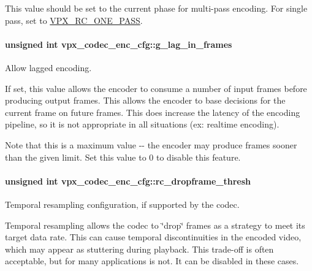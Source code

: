 \-This value should be set to the current phase for multi-\/pass encoding. \-For single pass, set to \hyperlink{group__encoder_gga476c5417f9c15a1dc5d3f68fa44c493fa7b6943a41868e8e26a77e9500f139ca1}{\-V\-P\-X\-\_\-\-R\-C\-\_\-\-O\-N\-E\-\_\-\-P\-A\-S\-S}. \hypertarget{structvpx__codec__enc__cfg_a992668d9e30305f3f7ab2672ea31a890}{
\paragraph[{g\-\_\-lag\-\_\-in\-\_\-frames}]{\setlength{\rightskip}{0pt plus 5cm}unsigned int {\bf vpx\-\_\-codec\-\_\-enc\-\_\-cfg\-::g\-\_\-lag\-\_\-in\-\_\-frames}}}\label{structvpx__codec__enc__cfg_a992668d9e30305f3f7ab2672ea31a890}


\-Allow lagged encoding. 

\-If set, this value allows the encoder to consume a number of input frames before producing output frames. \-This allows the encoder to base decisions for the current frame on future frames. \-This does increase the latency of the encoding pipeline, so it is not appropriate in all situations (ex\-: realtime encoding).

\-Note that this is a maximum value -\/-\/ the encoder may produce frames sooner than the given limit. \-Set this value to 0 to disable this feature. \hypertarget{structvpx__codec__enc__cfg_a619269f9a6904de58c4790e6806a3905}{
\paragraph[{rc\-\_\-dropframe\-\_\-thresh}]{\setlength{\rightskip}{0pt plus 5cm}unsigned int {\bf vpx\-\_\-codec\-\_\-enc\-\_\-cfg\-::rc\-\_\-dropframe\-\_\-thresh}}}\label{structvpx__codec__enc__cfg_a619269f9a6904de58c4790e6806a3905}


\-Temporal resampling configuration, if supported by the codec. 

\-Temporal resampling allows the codec to \char`\"{}drop\char`\"{} frames as a strategy to meet its target data rate. \-This can cause temporal discontinuities in the encoded video, which may appear as stuttering during playback. \-This trade-\/off is often acceptable, but for many applications is not. \-It can be disabled in these cases.

